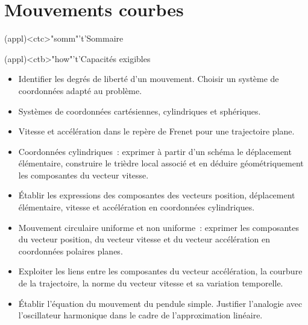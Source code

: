 \documentclass[../../main/main.tex]{subfiles}
\begin{document}
\setcounter{chapter}{2}


\chapter{Mouvements courbes}

\vspace*{\fill}

\begin{tcn}(appl)<ctc>"somm"'t'{Sommaire}
	\let\item\olditem
	\vspace{-15pt}
	\minitoc
	\vspace{-25pt}
\end{tcn}

\begin{tcn}[sidebyside]
	(appl)<ctb>"how"'t'{Capacités exigibles}
	\begin{itemize}[label=\rcheck]
		\item Identifier les degrés de liberté d'un mouvement. Choisir un système
		      de coordonnées adapté au problème.

		\item Systèmes de coordonnées cartésiennes, cylindriques et sphériques.

		\item Vitesse et accélération dans le repère de Frenet pour une
		      trajectoire plane.
	\end{itemize}
	\tcblower
	\begin{itemize}[label=\rcheck]
		\item Coordonnées cylindriques~: exprimer à partir d'un schéma le
		      déplacement élémentaire, construire le trièdre local associé et en
		      déduire géométriquement les composantes du vecteur vitesse.

		\item Établir les expressions des composantes des vecteurs position,
		      déplacement élémentaire, vitesse et accélération en coordonnées
		      cylindriques.

		\item Mouvement circulaire uniforme et non uniforme~: exprimer les
		      composantes du vecteur position, du vecteur vitesse et du vecteur
		      accélération en coordonnées polaires planes.

		\item Exploiter les liens entre les composantes du vecteur accélération,
		      la courbure de la trajectoire, la norme du vecteur vitesse et sa
		      variation temporelle.

		\item Établir l’équation du mouvement du pendule simple. Justifier
		      l’analogie avec l'oscillateur harmonique dans le cadre de
		      l'approximation linéaire.
	\end{itemize}
\end{tcn}
\end{document}
